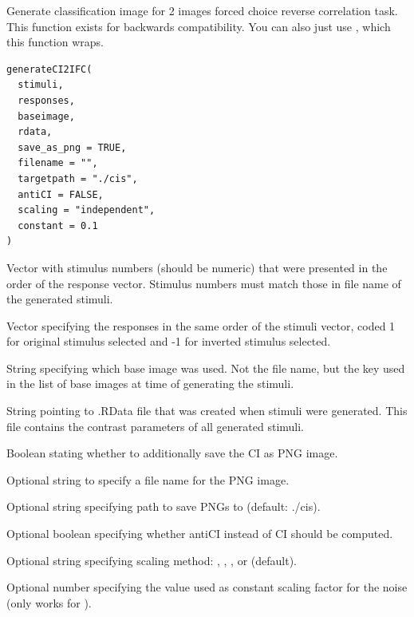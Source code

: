 \documentclass[letterpaper]{book}
\begin{document}
%
\begin{Description}
Generate classification image for 2 images forced choice reverse correlation task.  This function exists for backwards compatibility. You can also just use , which this function wraps.
\end{Description}
%
\begin{Usage}
\begin{verbatim}
generateCI2IFC(
  stimuli,
  responses,
  baseimage,
  rdata,
  save_as_png = TRUE,
  filename = "",
  targetpath = "./cis",
  antiCI = FALSE,
  scaling = "independent",
  constant = 0.1
)
\end{verbatim}
\end{Usage}
%
\begin{Arguments}
\begin{ldescription}
\item[\code{stimuli}] Vector with stimulus numbers (should be numeric) that were presented in the order of the response vector. Stimulus numbers must match those in file name of the generated stimuli.

\item[\code{responses}] Vector specifying the responses in the same order of the stimuli vector, coded 1 for original stimulus selected and -1 for inverted stimulus selected.

\item[\code{baseimage}] String specifying which base image was used. Not the file name, but the key used in the list of base images at time of generating the stimuli.

\item[\code{rdata}] String pointing to .RData file that was created when stimuli were generated. This file contains the contrast parameters of all generated stimuli.

\item[\code{save\_as\_png}] Boolean stating whether to additionally save the CI as PNG image.

\item[\code{filename}] Optional string to specify a file name for the PNG image.

\item[\code{targetpath}] Optional string specifying path to save PNGs to (default: ./cis).

\item[\code{antiCI}] Optional boolean specifying whether antiCI instead of CI should be computed.

\item[\code{scaling}] Optional string specifying scaling method: , , , or  (default).

\item[\code{constant}] Optional number specifying the value used as constant scaling factor for the noise (only works for ).
\end{ldescription}
\end{Arguments}
\end{document}
